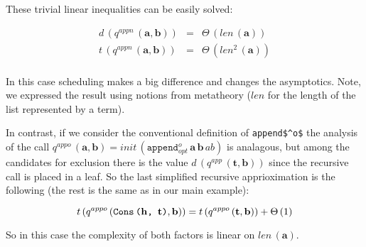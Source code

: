These trivial linear inequalities can be easily solved:

\[
\begin{array}{lcl}
d\,(q^{appn}\,(\mathbf{a}, \mathbf{b})) & = & \Theta\,(len\,(\mathbf{a})) \\
t\,(q^{appn}\,(\mathbf{a}, \mathbf{b})) & = & \Theta\,(len^2\,(\mathbf{a})) \\
\end{array}
 \]
 
In this case scheduling makes a big difference and changes the asymptotics. Note, we expressed the result using notions from metatheory
($len$ for the length of the list represented by a term).

In contrast, if we consider the conventional definition of \lstinline|append$^o$| the analysis of the call
$q^{appo}\,(\mathbf{a}, \mathbf{b}) = init\,(\texttt{append$^o_{opt}$} \, \mathbf{a} \, \mathbf{b} \, ab)$ is analagous,
but among the candidates for exclusion there is the value $d\,(q^{app}\,(\mathbf{t}, \mathbf{b}))$ since the recursive
call is placed in a leaf. So the last simplified recursive apprioximation is the following (the rest is
the same as in our main example):

\[t\,(q^{appo}\,(\texttt{Cons\,($\mathbf{h}$, $\mathbf{t}$)}, \mathbf{b})) = t\,(q^{appo}\,(\mathbf{t}, \mathbf{b})) + \Theta\,(1) \]

So in this case the complexity of both factors is linear on $len\,(\mathbf{a})$.
